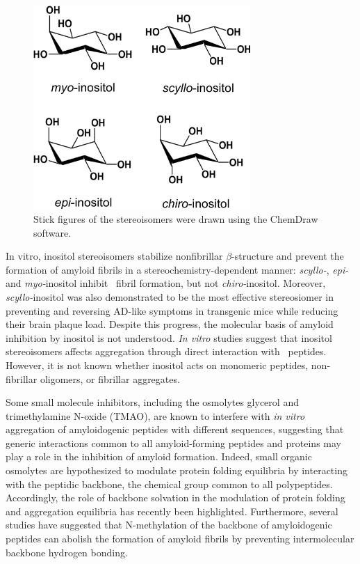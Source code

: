 \begin{figure}[htbp]
  \centering
  \includegraphics[width=3.25in]{figures/results1/GA4_paper_figures_submitted-1}
  \caption[Inositol stereoisomers most commonly found in nature.]
   {Stick figures of the stereoisomers were drawn using the ChemDraw software.}
   \label{fig:figure1}
\end{figure}

In vitro, inositol stereoisomers stabilize nonfibrillar $\beta$-structure and prevent the formation of amyloid fibrils in a stereochemistry-dependent manner: \textit{scyllo-}, \textit{epi-} and \textit{myo-}inositol inhibit \abeta\ fibril formation, but not \textit{chiro-}inositol.\cite{McLaurin:2000p64,McLaurin:1998p176,Nitz:2008p13,Sun:2008p12,Townsend:2006p44} Moreover, \textit{scyllo-}inositol was also demonstrated to be the most effective stereosiomer in preventing and reversing AD-like symptoms in transgenic mice while reducing their brain plaque load.\cite{McLaurin:2006p29} Despite this progress, the molecular basis of amyloid inhibition by inositol is not understood. \textit{In vitro} studies suggest that inositol stereoisomers affects aggregation through direct interaction with \abeta\ peptides.\cite{McLaurin:1998p176,McLaurin:2000p64,Nitz:2008p13,Sun:2008p12} However, it is not known whether inositol acts on monomeric peptides, non-fibrillar oligomers, or fibrillar aggregates.

Some small molecule inhibitors, including the osmolytes glycerol and trimethylamine N-oxide (TMAO), are known to interfere with \textit{in vitro} aggregation of amyloidogenic peptides with different sequences,\cite{Scaramozzino:2006p69,Yang:1999p77,McLaurin:2000p76,Ehrnhoefer:2008p8,Dasilva:2010p25,Bieschke:2010p32} suggesting that generic interactions common to all amyloid-forming peptides and proteins may play a role in the inhibition of amyloid formation. Indeed, small organic osmolytes are hypothesized to modulate protein folding equilibria by interacting with the peptidic backbone, the chemical group common to all polypeptides.\cite{Street:2006p21,Hu:2010p46,Auton:2008p28} Accordingly, the role of backbone solvation in the modulation of protein folding\cite{Rose:2006p35,Auton:2008p28} and aggregation equilibria has recently been highlighted.\cite{Rauscher:2006p43} Furthermore, several studies have suggested that N-methylation of the backbone of amyloidogenic peptides can abolish the formation of amyloid fibrils by preventing intermolecular backbone hydrogen bonding.\cite{Takeda:2010p52,Soto:2007p171}

